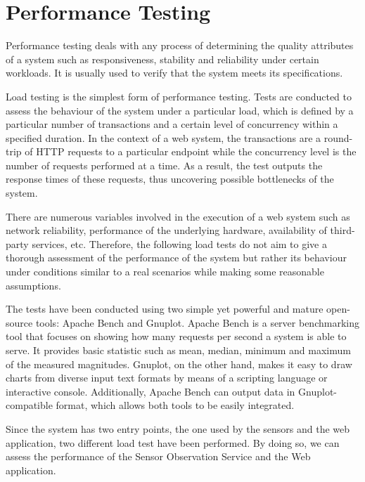 \chapter{Performance Testing}

Performance testing deals with any process of determining the quality attributes of a system such as responsiveness, stability and reliability under certain workloads. It is usually used to verify that the system meets its specifications.

Load testing is the simplest form of performance testing. Tests are conducted to assess the behaviour of the system under a particular load, which is defined by a particular number of transactions and a certain level of concurrency within a specified duration. In the context of a web system, the transactions are a round-trip of HTTP requests to a particular endpoint while the concurrency level is the number of requests performed at a time. As a result, the test outputs the response times of these requests, thus uncovering possible bottlenecks of the system.

There are numerous variables involved in the execution of a web system such as network reliability, performance of the underlying hardware, availability of third-party services, etc. Therefore, the following load tests do not aim to give a thorough assessment of the performance of the system but rather its behaviour under conditions similar to a real scenarios while making some reasonable assumptions.

The tests have been conducted using two simple yet powerful and mature open-source tools: Apache Bench and Gnuplot. Apache Bench is a server benchmarking tool that focuses on showing how many requests per second a system is able to serve. It provides basic statistic such as mean, median, minimum and maximum of the measured magnitudes. Gnuplot, on the other hand, makes it easy to draw charts from diverse input text formats by means of a scripting language or interactive console. Additionally, Apache Bench can output data in Gnuplot-compatible format, which allows both tools to be easily integrated.

Since the system has two entry points, the one used by the sensors and the web application, two different load test have been performed. By doing so, we can assess the performance of the Sensor Observation Service and the Web application.

